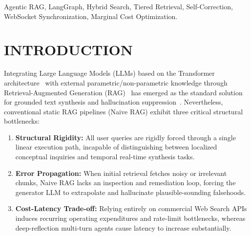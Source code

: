 \documentclass[conference]{IEEEtran}
\begin{document}
\begin{IEEEkeywords}
Agentic RAG, LangGraph, Hybrid Search, Tiered Retrieval, Self-Correction, WebSocket Synchronization, Marginal Cost Optimization.
\end{IEEEkeywords}

\section{INTRODUCTION}
Integrating Large Language Models (LLMs) based on the Transformer architecture~\cite{vaswani2017attention} with external parametric/non-parametric knowledge through Retrieval-Augmented Generation (RAG)~\cite{lewis2020retrieval} has emerged as the standard solution for grounded text synthesis and hallucination suppression~\cite{ji2023survey}. Nevertheless, conventional static RAG pipelines (Naive RAG) exhibit three critical structural bottlenecks:
\begin{enumerate}
    \item \textbf{Structural Rigidity:} All user queries are rigidly forced through a single linear execution path, incapable of distinguishing between localized conceptual inquiries and temporal real-time synthesis tasks.
    \item \textbf{Error Propagation:} When initial retrieval fetches noisy or irrelevant chunks, Naive RAG lacks an inspection and remediation loop, forcing the generator LLM to extrapolate and hallucinate plausible-sounding falsehoods.
    \item \textbf{Cost-Latency Trade-off:} Relying entirely on commercial Web Search APIs induces recurring operating expenditures and rate-limit bottlenecks, whereas deep-reflection multi-turn agents cause latency to increase substantially.
\end{enumerate}
\end{document}
